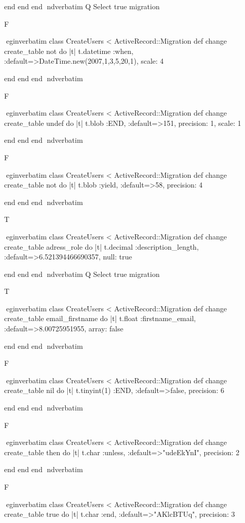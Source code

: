     end 
  end 
end
nd{verbatim}
Q
 Select true migration

F

egin{verbatim}
 class CreateUsers < ActiveRecord::Migration 
  def change 
    create_table not do |t| 
      t.datetime :when, :default=>DateTime.new(2007,1,3,5,20,1), scale: 4
    
    end 
  end 
end
nd{verbatim}

F

egin{verbatim}
 class CreateUsers < ActiveRecord::Migration 
  def change 
    create_table undef do |t| 
      t.blob :END, :default=>151, precision: 1, scale: 1
    
    end 
  end 
end
nd{verbatim}

F

egin{verbatim}
 class CreateUsers < ActiveRecord::Migration 
  def change 
    create_table not do |t| 
      t.blob :yield, :default=>58, precision: 4
    
    end 
  end 
end
nd{verbatim}

T

egin{verbatim}
 class CreateUsers < ActiveRecord::Migration 
  def change 
    create_table adress_role do |t| 
      t.decimal :description_length, :default=>6.521394466690357, null: true
    
    end 
  end 
end
nd{verbatim}
Q
 Select true migration

T

egin{verbatim}
 class CreateUsers < ActiveRecord::Migration 
  def change 
    create_table email_firstname do |t| 
      t.float :firstname_email, :default=>8.00725951955, array: false
    
    end 
  end 
end
nd{verbatim}

F

egin{verbatim}
 class CreateUsers < ActiveRecord::Migration 
  def change 
    create_table nil do |t| 
      t.tinyint(1) :END, :default=>false, precision: 6
    
    end 
  end 
end
nd{verbatim}

F

egin{verbatim}
 class CreateUsers < ActiveRecord::Migration 
  def change 
    create_table then do |t| 
      t.char :unless, :default=>"udeEkYnI", precision: 2
    
    end 
  end 
end
nd{verbatim}

F

egin{verbatim}
 class CreateUsers < ActiveRecord::Migration 
  def change 
    create_table true do |t| 
      t.char :end, :default=>"AKlcBTUq", precision: 3
    
